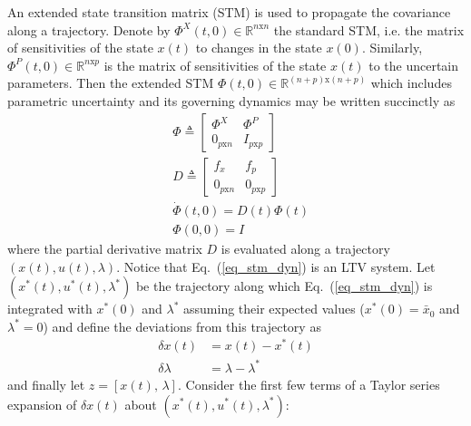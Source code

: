\documentclass[10pt,a4paper]{article}
\begin{document}
	An extended state transition matrix (STM) is used to propagate the covariance along a trajectory. Denote by $\Phi^X(t,0) \in \mathbb{R}^{n\mathrm{x}n}$ the standard STM, i.e. the matrix of sensitivities of the state $ x(t) $ to changes in the state $x(0)$. Similarly, $\Phi^P(t,0) \in \mathbb{R}^{n\mathrm{x}p}$ is the matrix of sensitivities of the state $ x(t) $ to the uncertain parameters. Then the extended STM $\Phi(t,0)\in\mathbb{R}^{(n+p)\mathrm{x}(n+p)}$ which includes parametric uncertainty and its governing dynamics may be written succinctly as 
	\begin{align}
	&\Phi \triangleq \left[\begin{array}{cc}
	\Phi^X & \Phi^P \\
	 0_{p\mathrm{x}n} & I_{p\mathrm{x}p}
	\end{array}\right] \\
	&D \triangleq \left[\begin{array}{cc}
		f_x & f_p \\
		 0_{p\mathrm{x}n} & 0_{p\mathrm{x}p}
		\end{array}\right] \\
		&\dot{\Phi}(t,0) = D(t)\Phi(t) \label{eq_stm_dyn} \\
		&\Phi(0,0) = I
	\end{align}
	where the partial derivative matrix $ D $ is evaluated along a trajectory $(x(t),u(t),\lambda)$. Notice that Eq.~(\ref{eq_stm_dyn}) is an LTV system. Let $(x^*(t),u^*(t),\lambda^*)$ be the trajectory along which Eq.~(\ref{eq_stm_dyn}) is integrated with $x^*(0)$ and $\lambda^*$ assuming their expected values ($x^*(0)=\bar{x}_0$ and $\lambda^*=0$) and define the deviations from this trajectory as
	\begin{align}
	\delta x(t) &= x(t)-x^*(t) \\
	\delta \lambda &= \lambda-\lambda^*
	\end{align}
	and finally let $z = [x(t),\,\lambda]$. Consider the first few terms of a Taylor series expansion of $\delta x(t) $ about $ (x^*(t),u^*(t),\lambda^*) $:
	
\end{document}
